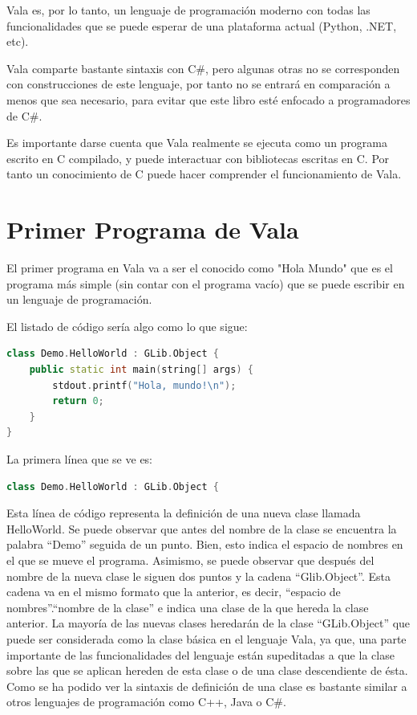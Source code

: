 \documentclass[12pt,twoside]{book}
\begin{document}
Vala es, por lo tanto, un lenguaje de programación moderno con todas las funcionalidades que se puede esperar de una plataforma actual (Python, .NET, etc).

Vala comparte bastante sintaxis con C\#, pero algunas otras no se corresponden con construcciones de este lenguaje, por tanto no se entrará en comparación a menos que sea necesario, para evitar que este libro esté enfocado a programadores de C\#.

 Es importante darse cuenta que Vala realmente se ejecuta como un programa escrito en C compilado, y puede interactuar con bibliotecas escritas en C. Por tanto un conocimiento de C puede hacer comprender el funcionamiento de Vala.

\section{Primer Programa de Vala}

El primer programa en Vala va a ser el conocido como "Hola Mundo" que es el programa más simple (sin contar con el programa vacío) que se puede escribir en un lenguaje de programación.

El listado de código sería algo como lo que sigue:

\begin{lstlisting}[language=C++]
class Demo.HelloWorld : GLib.Object {
	public static int main(string[] args) {
		stdout.printf("Hola, mundo!\n");
		return 0;
	}
}
\end{lstlisting}


 La primera línea que se ve es:
\begin{lstlisting}[language=C++]
class Demo.HelloWorld : GLib.Object {
\end{lstlisting}

Esta línea de código representa la definición de una nueva clase llamada HelloWorld. Se puede observar que antes del nombre de la clase se encuentra la palabra ``Demo'' seguida de un punto. Bien, esto indica el espacio de nombres en el que se mueve el programa. Asimismo, se puede observar que después del nombre de la nueva clase le siguen dos puntos y la cadena ``Glib.Object''. Esta cadena va en el mismo formato que la anterior, es decir, ``espacio de nombres''.``nombre de la clase'' e indica una clase de la que hereda la clase anterior. La mayoría de las nuevas clases heredarán de la clase ``GLib.Object'' que puede ser considerada como la clase básica en el lenguaje Vala, ya que, una parte importante de las funcionalidades del lenguaje están supeditadas a que la clase sobre las que se aplican hereden de esta clase o de una clase descendiente de ésta. Como se ha podido ver la sintaxis de definición de una clase es bastante similar a otros lenguajes de programación como C++, Java o C\#.
\end{document}
